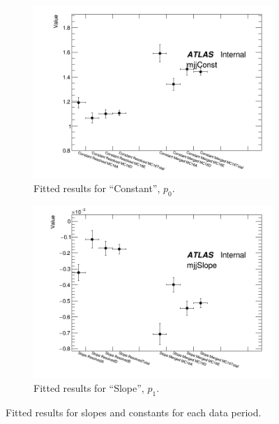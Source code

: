 \begin{figure}[ht]
    \centering
    \begin{subfigure}[b]{0.45\textwidth}
        \centering
        \includegraphics[width=\textwidth]{figures/mjjreweight1lep/TotalConstant.png}
        \caption{Fitted results for ``Constant'', $p_0$.}
        \label{fig:TotalConstant}
    \end{subfigure}
    \hfill
    \begin{subfigure}[b]{0.45\textwidth}
        \centering
        \includegraphics[width=\textwidth]{figures/mjjreweight1lep/TotalSlope.png}
        \caption{Fitted results for ``Slope'', $p_1$.}
        \label{fig:TotalSlope}
    \end{subfigure}
    \caption{Fitted results for slopes and constants for each data period.}
    \label{fig:mjjReweight1LepResTotal}
\end{figure}


